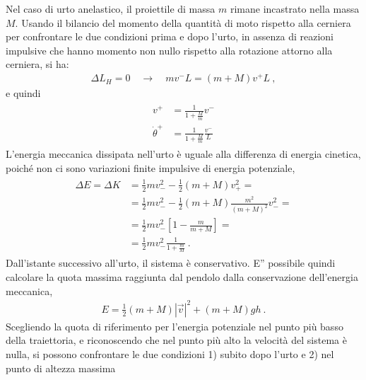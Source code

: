 \documentclass[letterpaper,10pt,italian]{jupyterBook}
\begin{document}
\sphinxAtStartPar
{} Nel caso di urto anelastico, il proiettile di massa \(m\) rimane incastrato nella massa \(M\). Usando il bilancio del momento della quantità di moto rispetto alla cerniera per confrontare le due condizioni prima e dopo l’urto, in assenza di reazioni impulsive che hanno momento non nullo rispetto alla rotazione attorno alla cerniera, si ha:
\begin{equation*}
\begin{split}\Delta L_H = 0 \quad \rightarrow \quad m v^- L = (m+M) v^+ L \ ,\end{split}
\end{equation*}
\sphinxAtStartPar
e quindi
\begin{equation*}
\begin{split}\begin{aligned}
   v^+            & = \frac{1}{1+ \frac{M}{m}} v^-  \\
   \dot{\theta}^+ & = \frac{1}{1+ \frac{M}{m}} \frac{v^-}{L}  
\end{aligned}\end{split}
\end{equation*}
\sphinxAtStartPar
L’energia meccanica dissipata nell’urto è uguale alla differenza di energia cinetica, poiché non ci sono variazioni finite impulsive di energia potenziale,
\begin{equation*}
\begin{split}\begin{aligned}
  \Delta E = \Delta K 
  & = \frac{1}{2} m v_-^2 - \frac{1}{2} (m + M) v_+^2 = \\
  & = \frac{1}{2} m v_-^2 - \frac{1}{2} (m + M) \frac{m^2}{(m+M)^2} v_-^2 = \\
  & = \frac{1}{2} m v_-^2 \left[ 1 - \frac{m}{m+M} \right] = \\
  & = \frac{1}{2} m v_-^2 \frac{1}{1+\frac{m}{M}} \ .
\end{aligned}\end{split}
\end{equation*}
\sphinxAtStartPar
Dall’istante successivo all’urto, il sistema è conservativo. E” possibile quindi calcolare la quota massima raggiunta dal pendolo dalla conservazione dell’energia meccanica,
\begin{equation*}
\begin{split}E = \frac{1}{2} (m+M) |\vec{v}|^2 + (m+M) g h \ .\end{split}
\end{equation*}
\sphinxAtStartPar
Scegliendo la quota di riferimento per l’energia potenziale nel punto più basso della traiettoria, e riconoscendo che nel punto più alto la velocità del sistema è nulla, si possono confrontare le due condizioni 1) subito dopo l’urto e 2) nel punto di altezza massima
\end{document}

